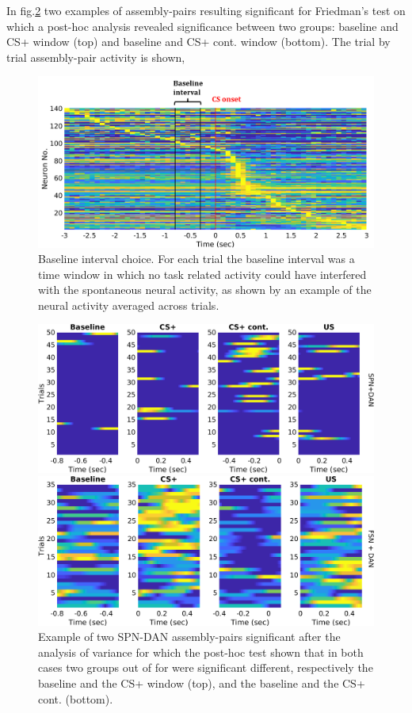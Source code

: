 In fig.\ref{fig:SPN_Ex} two examples of assembly-pairs resulting significant for Friedman's test on which a post-hoc analysis revealed significance between two groups: baseline and CS+ window (top) and baseline and CS+ cont. window (bottom). The trial by trial assembly-pair activity is shown, 
\begin{figure}
    \centering
    \includegraphics[scale=0.6]{figures/Baseline.png}
    \caption{Baseline interval choice. For each trial the baseline interval was a time window in which no task related activity could have interfered with the spontaneous neural activity, as shown by an example of the neural activity averaged across trials.}
    \label{fig:Baseline}
\end{figure}
\begin{figure}
    \centering
    \includegraphics[scale=0.4]{figures/SPN_DANexPreRew.png}
    
   \vspace{1cm}
   
   \includegraphics[scale=0.4]{figures/FSN_DANexStimRew.png}
    \caption{Example of two SPN-DAN assembly-pairs significant after the analysis of variance for which the post-hoc test shown that in both cases two groups out of for were significant different, respectively the baseline and the CS+ window (top), and the baseline and the CS+ cont. (bottom).}
    \label{fig:SPN_Ex}
\end{figure}
